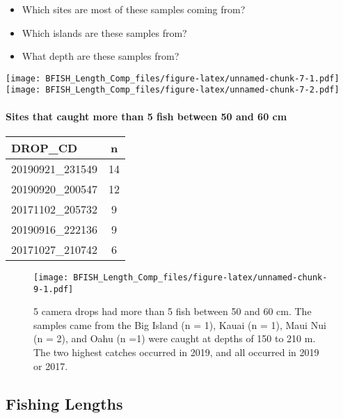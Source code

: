 \documentclass[
]{article}
\providecommand{\tightlist}{%
  \setlength{\itemsep}{0pt}\setlength{\parskip}{0pt}}
\begin{document}
\begin{itemize}
\tightlist
\item
  Which sites are most of these samples coming from?
\item
  Which islands are these samples from?\\
\item
  What depth are these samples from?
\end{itemize}

\texttt{[image: BFISH\_Length\_Comp\_files/figure-latex/unnamed-chunk-7-1.pdf]}
\texttt{[image: BFISH\_Length\_Comp\_files/figure-latex/unnamed-chunk-7-2.pdf]}

\hypertarget{sites-that-caught-more-than-5-fish-between-50-and-60-cm}{%
\paragraph{Sites that caught more than 5 fish between 50 and 60
cm}\label{sites-that-caught-more-than-5-fish-between-50-and-60-cm}}

\captionsetup[table]{labelformat=empty,skip=1pt}
\begin{longtable}{lc}
\toprule
DROP\_CD & n \\ 
\midrule
20190921\_231549 & 14 \\ 
20190920\_200547 & 12 \\ 
20171102\_205732 & 9 \\ 
20190916\_222136 & 9 \\ 
20171027\_210742 & 6 \\ 
\bottomrule
\end{longtable}

\begin{figure}
\centering
\texttt{[image: BFISH\_Length\_Comp\_files/figure-latex/unnamed-chunk-9-1.pdf]}
\caption{5 camera drops had more than 5 fish between 50 and 60 cm. The
samples came from the Big Island (n = 1), Kauai (n = 1), Maui Nui (n =
2), and Oahu (n =1) were caught at depths of 150 to 210 m. The two
highest catches occurred in 2019, and all occurred in 2019 or 2017.}
\end{figure}

\hypertarget{fishing-lengths}{%
\subsection{Fishing Lengths}\label{fishing-lengths}}
\end{document}
